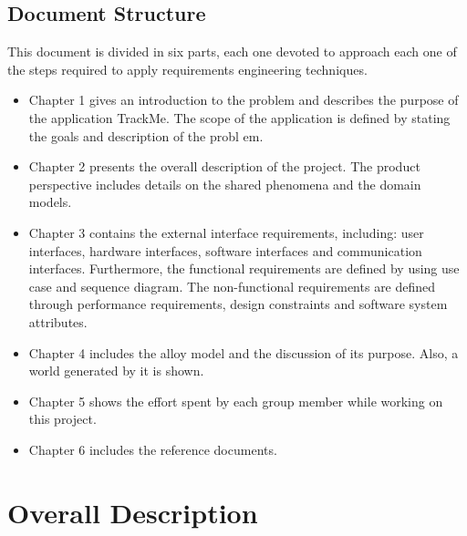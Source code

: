 \documentclass[12pt]{article}
\begin{document}
\subsection{Document Structure}
This document is divided in six parts, each one devoted to approach each one of the steps required to apply requirements engineering techniques.\\
\begin{itemize}
\item Chapter 1 gives an introduction to the problem and describes the purpose of the application TrackMe. The scope of the application is defined by stating the goals and description of the probl	em.
\item Chapter 2 presents the overall description of the project. The product perspective includes details on the shared phenomena and the domain models.
\item Chapter 3 contains the external interface requirements, including: user interfaces, hardware interfaces, software interfaces and communication interfaces. Furthermore, the functional requirements are defined by using use case and sequence diagram. The non-functional requirements are defined through performance requirements, design constraints and software system attributes.
\item Chapter 4 includes the alloy model and the discussion of its purpose. Also, a world generated by it is shown.
\item Chapter 5 shows the effort spent by each group member while working on this project.
\item Chapter 6 includes the reference documents.
\end{itemize}

\section{Overall Description}
\end{document}
